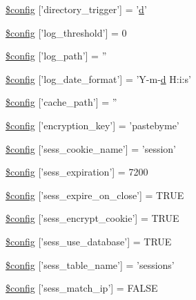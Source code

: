 \begin{DoxyCompactItemize}
\item 
\hyperlink{application_2config_2config_8php_af7e6593d4088b77d153dafff4567f143}{\$config} \mbox{[}'directory\-\_\-trigger'\mbox{]} = '\hyperlink{bootstrap_8min_8js_aeb337d295abaddb5ec3cb34cc2e2bbc9}{d}'
\item 
\hyperlink{application_2config_2config_8php_a7e7fe9a5aa2c85e48865b154035dab6a}{\$config} \mbox{[}'log\-\_\-threshold'\mbox{]} = 0
\item 
\hyperlink{application_2config_2config_8php_aee8524f2388d21b1c73de5c48a82b687}{\$config} \mbox{[}'log\-\_\-path'\mbox{]} = ''
\item 
\hyperlink{application_2config_2config_8php_a9cc05811c32c13c55ed407435a3a31b6}{\$config} \mbox{[}'log\-\_\-date\-\_\-format'\mbox{]} = 'Y-\/m-\/\hyperlink{bootstrap_8min_8js_aeb337d295abaddb5ec3cb34cc2e2bbc9}{d} H\-:i\-:s'
\item 
\hyperlink{application_2config_2config_8php_ae3a5dd52b4d040adb6461b9a17d1e0f0}{\$config} \mbox{[}'cache\-\_\-path'\mbox{]} = ''
\item 
\hyperlink{application_2config_2config_8php_aefa5c9d6e7a454a6218df87e65796357}{\$config} \mbox{[}'encryption\-\_\-key'\mbox{]} = 'pastebyme'
\item 
\hyperlink{application_2config_2config_8php_acaf9fb6347a03527f4b04198d6d8155b}{\$config} \mbox{[}'sess\-\_\-cookie\-\_\-name'\mbox{]} = 'session'
\item 
\hyperlink{application_2config_2config_8php_ad6a3784cad81991936465dcdac74b66a}{\$config} \mbox{[}'sess\-\_\-expiration'\mbox{]} = 7200
\item 
\hyperlink{application_2config_2config_8php_afe76a77df2001e739290d58bf6029036}{\$config} \mbox{[}'sess\-\_\-expire\-\_\-on\-\_\-close'\mbox{]} = T\-R\-U\-E
\item 
\hyperlink{application_2config_2config_8php_aed8943fa55fc74e62b540e8638c03038}{\$config} \mbox{[}'sess\-\_\-encrypt\-\_\-cookie'\mbox{]} = T\-R\-U\-E
\item 
\hyperlink{application_2config_2config_8php_ae320549e749a21903b685e363820370a}{\$config} \mbox{[}'sess\-\_\-use\-\_\-database'\mbox{]} = T\-R\-U\-E
\item 
\hyperlink{application_2config_2config_8php_ab65a6c6a4a0f2339707a4c20c44bf16b}{\$config} \mbox{[}'sess\-\_\-table\-\_\-name'\mbox{]} = 'sessions'
\item 
\hyperlink{application_2config_2config_8php_aed449d12f2854249e5f7229fafb269b2}{\$config} \mbox{[}'sess\-\_\-match\-\_\-ip'\mbox{]} = F\-A\-L\-S\-E
\item 

\end{DoxyCompactItemize}
